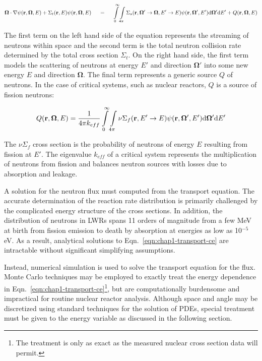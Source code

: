 \begin{dmath}
\label{eqn:chap1-transport-ce}
\mathbf{\Omega} \cdot \nabla \psi(\mathbf{r},\mathbf{\Omega},E) + \Sigma_{t}(\mathbf{r},E)\psi(\mathbf{r},\mathbf{\Omega},E) \;\;\;\;\; = \;\;\;\;\; \int\displaylimits_{0}^{\infty}\int\displaylimits_{4\pi} \Sigma_{s}(\mathbf{r},{\mathbf{\Omega'}\rightarrow\mathbf{\Omega}},{E'\rightarrow E}) \psi(\mathbf{r},\mathbf{\Omega'},E') \mathrm{d}\mathbf{\Omega'} \mathrm{d}E' + Q(\mathbf{r},\mathbf{\Omega},E)
\end{dmath}

The first term on the left hand side of the equation represents the streaming of neutrons within space and the second term is the total neutron collision rate determined by the total cross section $\Sigma_{t}$. On the right hand side, the first term models the scattering of neutrons at energy $E'$ and direction $\mathbf{\Omega'}$ into some new energy $E$ and direction $\mathbf{\Omega}$. The final term represents a generic source $Q$ of neutrons. In the case of critical systems, such as nuclear reactors, $Q$ is a source of fission neutrons:

\begin{dmath}
\label{eqn:chap1-source}
Q(\mathbf{r},\mathbf{\Omega},E) = \frac{1}{4\pi k_{eff}}\int\displaylimits_{0}^{\infty}\int\displaylimits_{4\pi} \nu\Sigma_{f}(\mathbf{r},{E'\rightarrow E})\psi(\mathbf{r},\mathbf{\Omega'},E') \mathrm{d}\mathbf{\Omega'} \mathrm{d}E'
\end{dmath}

The $\nu\Sigma_{f}$ cross section is the probability of neutrons of energy $E$ resulting from fission at $E'$. The eigenvalue $k_{eff}$ of a critical system represents the multiplication of neutrons from fission and balances neutron sources with losses due to absorption and leakage.

A solution for the neutron flux must computed from the transport equation. The accurate determination of the reaction rate distribution is primarily challenged by  the complicated energy structure of the cross sections. In addition, the distribution of neutrons in \ac{LWRs} spans 11 orders of magnitude from a few MeV at birth from fission emission to death by absorption at energies as low as 10$^{-5}$ eV. As a result, analytical solutions to Eqn.~\ref{eqn:chap1-transport-ce} are intractable without significant simplifying assumptions.

Instead, numerical simulation is used to solve the transport equation for the flux. Monte Carlo techniques may be employed to exactly treat the energy dependence in Eqn.~\ref{eqn:chap1-transport-ce}\footnote{The treatment is only as exact as the measured nuclear cross section data will permit.}, but are computationally burdensome and impractical for routine nuclear reactor analysis. Although space and angle may be discretized using standard techniques for the solution of PDEs, special treatment must be given to the energy variable as discussed in the following section.


